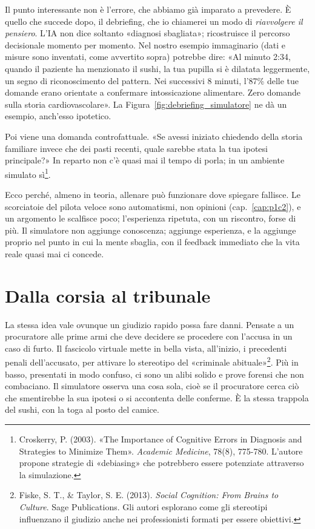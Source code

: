 Il punto interessante non è l'errore, che abbiamo già imparato a prevedere. È quello che succede dopo, il debriefing, che io chiamerei un modo di \emph{riavvolgere il pensiero}. L'IA non dice soltanto «diagnosi sbagliata»; ricostruisce il percorso decisionale momento per momento. Nel nostro esempio immaginario (dati e misure sono inventati, come avvertito sopra) potrebbe dire: «Al minuto 2:34, quando il paziente ha menzionato il sushi, la tua pupilla si è dilatata leggermente, un segno di riconoscimento del pattern. Nei successivi 8 minuti, l'87\% delle tue domande erano orientate a confermare intossicazione alimentare. Zero domande sulla storia cardiovascolare». La Figura~\ref{fig:debriefing_simulatore} ne dà un esempio, anch'esso ipotetico.


Poi viene una domanda controfattuale. «Se avessi iniziato chiedendo della storia familiare invece che dei pasti recenti, quale sarebbe stata la tua ipotesi principale?» In reparto non c'è quasi mai il tempo di porla; in un ambiente simulato sì\footnote{Croskerry, P. (2003). «The Importance of Cognitive Errors in Diagnosis and Strategies to Minimize Them». \textit{Academic Medicine}, 78(8), 775-780. L'autore propone strategie di «debiasing» che potrebbero essere potenziate attraverso la simulazione.}.

Ecco perché, almeno in teoria, allenare può funzionare dove spiegare fallisce. Le scorciatoie del pilota veloce sono automatismi, non opinioni (cap.~\ref{cap:p1c2}), e un argomento le scalfisce poco; l'esperienza ripetuta, con un riscontro, forse di più. Il simulatore non aggiunge conoscenza; aggiunge esperienza, e la aggiunge proprio nel punto in cui la mente sbaglia, con il feedback immediato che la vita reale quasi mai ci concede.

\section{Dalla corsia al tribunale}
\label{sec:p4c33-dalla-corsia-all}
La stessa idea vale ovunque un giudizio rapido possa fare danni. Pensate a un procuratore alle prime armi che deve decidere se procedere con l'accusa in un caso di furto. Il fascicolo virtuale mette in bella vista, all'inizio, i precedenti penali dell'accusato, per attivare lo stereotipo del «criminale abituale»\footnote{Fiske, S. T., \& Taylor, S. E. (2013). \textit{Social Cognition: From Brains to Culture}. Sage Publications. Gli autori esplorano come gli stereotipi influenzano il giudizio anche nei professionisti formati per essere obiettivi.}. Più in basso, presentati in modo confuso, ci sono un alibi solido e prove forensi che non combaciano. Il simulatore osserva una cosa sola, cioè se il procuratore cerca ciò che smentirebbe la sua ipotesi o si accontenta delle conferme. È la stessa trappola del sushi, con la toga al posto del camice.

